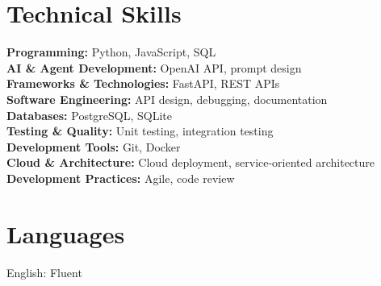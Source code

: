 \documentclass[letterpaper,11pt]{article}
\begin{document}
\section{Technical Skills}
\textbf{Programming:} Python, JavaScript, SQL \\
\textbf{AI \& Agent Development:} OpenAI API, prompt design \\
\textbf{Frameworks \& Technologies:} FastAPI, REST APIs \\
\textbf{Software Engineering:} API design, debugging, documentation \\
\textbf{Databases:} PostgreSQL, SQLite \\
\textbf{Testing \& Quality:} Unit testing, integration testing \\
\textbf{Development Tools:} Git, Docker \\
\textbf{Cloud \& Architecture:} Cloud deployment, service-oriented architecture \\
\textbf{Development Practices:} Agile, code review


\section{Languages}
English: Fluent
\end{document}
